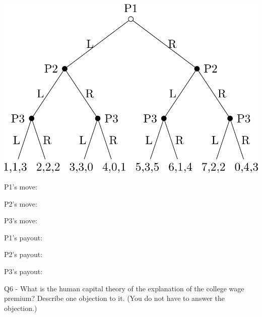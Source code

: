 \documentclass[
  12pt,
  letterpaper,
  DIV=11,
  numbers=noendperiod]{scrartcl}
\begin{document}
\vspace{1cm}

\includegraphics[width=1\textwidth,height=\textheight]{fig-back-1.png}

\vspace{1cm}

P1's move: \dotfill

P2's move: \dotfill

P3's move: \dotfill

P1's payout: \dotfill

P2's payout: \dotfill

P3's payout: \dotfill

\newpage

Q6 - What is the human capital theory of the explanation of the college
wage premium? Describe one objection to it. (You do not have to answer
the objection.)

\vspace{0.3cm} \dotfill

\vspace{0.3cm} \dotfill

\vspace{0.3cm} \dotfill

\vspace{0.3cm} \dotfill

\vspace{0.3cm} \dotfill

\vspace{0.3cm} \dotfill

\vspace{0.3cm} \dotfill

\vspace{0.3cm} \dotfill

\vspace{0.3cm} \dotfill
\end{document}
